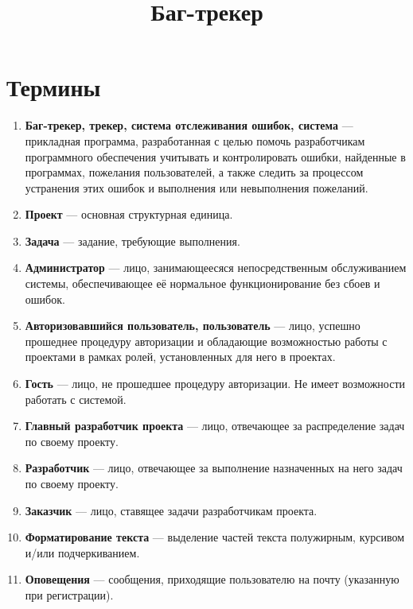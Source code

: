 \documentclass[14pt,a4paper]{extarticle}
\begin{document}
	
	\title {Баг-трекер}
	
	\section {Термины}
	\begin{enumerate}
		\item {\bf Баг-трекер, трекер, система отслеживания ошибок, система} --- прикладная программа, разработанная с целью помочь разработчикам программного обеспечения учитывать и контролировать ошибки, найденные в программах, пожелания пользователей, а также следить за процессом устранения этих ошибок и выполнения или невыполнения пожеланий.
		
		\item {\bf Проект} --- основная структурная единица.
		
		\item {\bf Задача} --- задание, требующие выполнения.
		
		\item {\bf Администратор} --- лицо, занимающеесяся непосредственным обслуживанием системы, обеспечивающее её нормальное функционирование без сбоев и ошибок.
		
		\item {\bf Авторизовавшийся пользователь, пользователь} --- лицо, успешно прошеднее процедуру авторизации и обладающие возможностью работы с проектами в рамках ролей, установленных для него в проектах.
		
		\item {\bf Гость} --- лицо, не прошедшее процедуру авторизации. Не имеет возможности работать с системой.
		
		\item {\bf Главный разработчик проекта} --- лицо, отвечающее за распределение задач по своему проекту.
		
		\item {\bf Разработчик} --- лицо, отвечающее за выполнение назначенных на него задач по своему проекту.
		
		\item {\bf Заказчик} --- лицо, ставящее задачи разработчикам проекта.
		
		\item {\bf Форматирование текста} --- выделение частей текста полужирным, курсивом и/или подчеркиванием.
		
		\item {\bf Оповещения} --- сообщения, приходящие пользователю на почту (указанную при регистрации).
	\end{enumerate}
	
\end{document}

